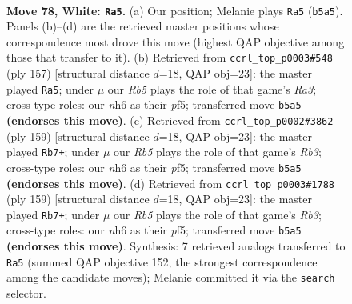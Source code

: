 \documentclass[11pt]{article}
\begin{document}
\clearpage

\begin{figure}[p]\centering
\begin{subfigure}{0.46\textwidth}\centering
\resizebox{\linewidth}{!}{%
\newchessgame
\chessboard[
  setfen={3k4/8/7n/1R6/p6r/P6p/7K/8 w - - 14 78},
  showmover=false,
  pgfstyle=straightmove, color=movearrow, markmove={b5-a5}
]}
\caption{}
\end{subfigure}\hfill
\begin{subfigure}{0.46\textwidth}\centering
\resizebox{\linewidth}{!}{%
\newchessgame
\chessboard[
  setfen={8/4K2k/r6P/5P1R/8/8/8/8 b - - 16 79},
  showmover=false,
  pgfstyle=straightmove, color=movearrow, markmove={a6-a5}
]}
\caption{}
\end{subfigure}
\\[4pt]
\begin{subfigure}{0.46\textwidth}\centering
\resizebox{\linewidth}{!}{%
\newchessgame
\chessboard[
  setfen={8/4K2k/1r5P/5P1R/8/8/8/8 b - - 22 80},
  showmover=false,
  pgfstyle=straightmove, color=movearrow, markmove={b6-b7}
]}
\caption{}
\end{subfigure}\hfill
\begin{subfigure}{0.46\textwidth}\centering
\resizebox{\linewidth}{!}{%
\newchessgame
\chessboard[
  setfen={8/4K2k/1r5P/5P1R/8/8/8/8 b - - 42 80},
  showmover=false,
  pgfstyle=straightmove, color=movearrow, markmove={b6-b7}
]}
\caption{}
\end{subfigure}
\caption{\textbf{Move 78, White: \texttt{Ra5}.} (a) Our position; Melanie plays \texttt{Ra5} (\texttt{b5a5}). Panels (b)--(d) are the retrieved master positions whose correspondence most drove this move (highest QAP objective among those that transfer to it). (b) Retrieved from \texttt{ccrl\_top\_p0003\#548} (ply 157) [structural distance $d$=18, QAP obj=23]: the master played \texttt{Ra5}; under $\mu$ our \emph{Rb5} plays the role of that game's \emph{Ra3}; cross-type roles: our \emph{n}h6 as their \emph{p}f5; transferred move \texttt{b5a5} \textbf{(endorses this move)}. (c) Retrieved from \texttt{ccrl\_top\_p0002\#3862} (ply 159) [structural distance $d$=18, QAP obj=23]: the master played \texttt{Rb7+}; under $\mu$ our \emph{Rb5} plays the role of that game's \emph{Rb3}; cross-type roles: our \emph{n}h6 as their \emph{p}f5; transferred move \texttt{b5a5} \textbf{(endorses this move)}. (d) Retrieved from \texttt{ccrl\_top\_p0003\#1788} (ply 159) [structural distance $d$=18, QAP obj=23]: the master played \texttt{Rb7+}; under $\mu$ our \emph{Rb5} plays the role of that game's \emph{Rb3}; cross-type roles: our \emph{n}h6 as their \emph{p}f5; transferred move \texttt{b5a5} \textbf{(endorses this move)}. Synthesis: 7 retrieved analogs transferred to \texttt{Ra5} (summed QAP objective 152, the strongest correspondence among the candidate moves); Melanie committed it via the \texttt{search} selector.}
\label{fig:thought-m154}
\end{figure}
\end{document}
